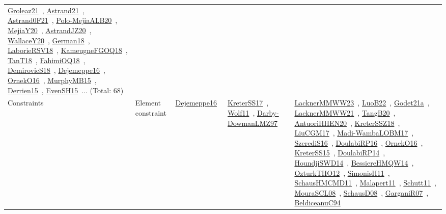 {\begin{longtable}{lp{3cm}>{\raggedright\arraybackslash}p{6cm}>{\raggedright\arraybackslash}p{6cm}>{\raggedright\arraybackslash}p{8cm}}
\href{../works/Groleaz21.pdf}{Groleaz21}~\cite{Groleaz21}, \href{../works/Astrand21.pdf}{Astrand21}~\cite{Astrand21}, \href{../works/Astrand0F21.pdf}{Astrand0F21}~\cite{Astrand0F21}, \href{../works/Polo-MejiaALB20.pdf}{Polo-MejiaALB20}~\cite{Polo-MejiaALB20}, \href{../works/MejiaY20.pdf}{MejiaY20}~\cite{MejiaY20}, \href{../works/AstrandJZ20.pdf}{AstrandJZ20}~\cite{AstrandJZ20}, \href{../works/WallaceY20.pdf}{WallaceY20}~\cite{WallaceY20}, \href{../works/German18.pdf}{German18}~\cite{German18}, \href{../works/LaborieRSV18.pdf}{LaborieRSV18}~\cite{LaborieRSV18}, \href{../works/KameugneFGOQ18.pdf}{KameugneFGOQ18}~\cite{KameugneFGOQ18}, \href{../works/TanT18.pdf}{TanT18}~\cite{TanT18}, \href{../works/FahimiOQ18.pdf}{FahimiOQ18}~\cite{FahimiOQ18}, \href{../works/DemirovicS18.pdf}{DemirovicS18}~\cite{DemirovicS18}, \href{../works/Dejemeppe16.pdf}{Dejemeppe16}~\cite{Dejemeppe16}, \href{../works/OrnekO16.pdf}{OrnekO16}~\cite{OrnekO16}, \href{../works/MurphyMB15.pdf}{MurphyMB15}~\cite{MurphyMB15}, \href{../works/Derrien15.pdf}{Derrien15}~\cite{Derrien15}, \href{../works/EvenSH15.pdf}{EvenSH15}~\cite{EvenSH15}... (Total: 68)\\
Constraints & Element constraint & \href{../works/Dejemeppe16.pdf}{Dejemeppe16}~\cite{Dejemeppe16} & \href{../works/KreterSS17.pdf}{KreterSS17}~\cite{KreterSS17}, \href{../works/Wolf11.pdf}{Wolf11}~\cite{Wolf11}, \href{../works/Darby-DowmanLMZ97.pdf}{Darby-DowmanLMZ97}~\cite{Darby-DowmanLMZ97} & \href{../works/LacknerMMWW23.pdf}{LacknerMMWW23}~\cite{LacknerMMWW23}, \href{../works/LuoB22.pdf}{LuoB22}~\cite{LuoB22}, \href{../works/Godet21a.pdf}{Godet21a}~\cite{Godet21a}, \href{../works/LacknerMMWW21.pdf}{LacknerMMWW21}~\cite{LacknerMMWW21}, \href{../works/TangB20.pdf}{TangB20}~\cite{TangB20}, \href{../works/AntuoriHHEN20.pdf}{AntuoriHHEN20}~\cite{AntuoriHHEN20}, \href{../works/KreterSSZ18.pdf}{KreterSSZ18}~\cite{KreterSSZ18}, \href{../works/LiuCGM17.pdf}{LiuCGM17}~\cite{LiuCGM17}, \href{../works/Madi-WambaLOBM17.pdf}{Madi-WambaLOBM17}~\cite{Madi-WambaLOBM17}, \href{../works/SzerediS16.pdf}{SzerediS16}~\cite{SzerediS16}, \href{../works/DoulabiRP16.pdf}{DoulabiRP16}~\cite{DoulabiRP16}, \href{../works/OrnekO16.pdf}{OrnekO16}~\cite{OrnekO16}, \href{../works/KreterSS15.pdf}{KreterSS15}~\cite{KreterSS15}, \href{../works/DoulabiRP14.pdf}{DoulabiRP14}~\cite{DoulabiRP14}, \href{../works/HoundjiSWD14.pdf}{HoundjiSWD14}~\cite{HoundjiSWD14}, \href{../works/BessiereHMQW14.pdf}{BessiereHMQW14}~\cite{BessiereHMQW14}, \href{../works/OzturkTHO12.pdf}{OzturkTHO12}~\cite{OzturkTHO12}, \href{../works/SimonisH11.pdf}{SimonisH11}~\cite{SimonisH11}, \href{../works/SchausHMCMD11.pdf}{SchausHMCMD11}~\cite{SchausHMCMD11}, \href{../works/Malapert11.pdf}{Malapert11}~\cite{Malapert11}, \href{../works/Schutt11.pdf}{Schutt11}~\cite{Schutt11}, \href{../works/MouraSCL08.pdf}{MouraSCL08}~\cite{MouraSCL08}, \href{../works/SchausD08.pdf}{SchausD08}~\cite{SchausD08}, \href{../works/GarganiR07.pdf}{GarganiR07}~\cite{GarganiR07}, \href{../works/BeldiceanuC94.pdf}{BeldiceanuC94}~\cite{BeldiceanuC94}\\

\end{longtable}}
